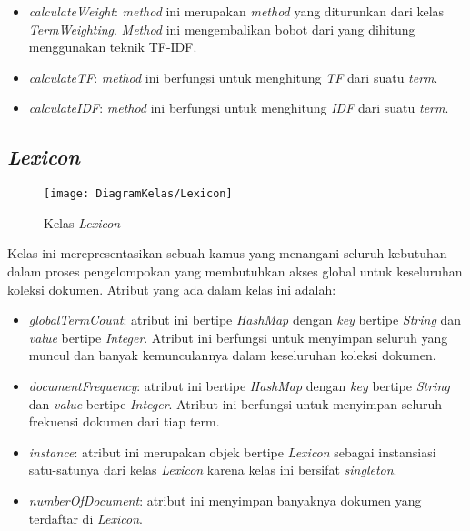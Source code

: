 \begin{itemize}
	\item \textit{calculateWeight}: \textit{method} ini merupakan \textit{method} yang diturunkan dari kelas \textit{TermWeighting}. \textit{Method} ini mengembalikan bobot dari \term yang dihitung menggunakan teknik TF-IDF.
	\item \textit{calculateTF}: \textit{method} ini berfungsi untuk menghitung \textit{TF} dari suatu \textit{term}.
	\item \textit{calculateIDF}: \textit{method} ini berfungsi untuk menghitung \textit{IDF} dari suatu \textit{term}.
\end{itemize}

\subsection{\textit{Lexicon}}

\begin{figure}[H]
	\begin{center}
		\texttt{[image: DiagramKelas/Lexicon]}
		\caption{Kelas \textit{Lexicon}}
		\label{fig:kelasLexicon}
	\end{center}
\end{figure}

Kelas ini merepresentasikan sebuah kamus yang menangani seluruh kebutuhan dalam proses pengelompokan yang membutuhkan akses global untuk keseluruhan koleksi dokumen. Atribut yang ada dalam kelas ini adalah:

\begin{itemize}
	\item \textit{globalTermCount}: atribut ini bertipe \textit{HashMap} dengan \textit{key} bertipe \textit{String} dan \textit{value} bertipe \textit{Integer}. Atribut ini berfungsi untuk menyimpan seluruh \term yang muncul dan banyak kemunculannya dalam keseluruhan koleksi dokumen.
	\item \textit{documentFrequency}: atribut ini bertipe \textit{HashMap} dengan \textit{key} bertipe \textit{String} dan \textit{value} bertipe \textit{Integer}. Atribut ini berfungsi untuk menyimpan seluruh frekuensi dokumen dari tiap term.
	\item \textit{instance}: atribut ini merupakan objek bertipe \textit{Lexicon} sebagai instansiasi satu-satunya dari kelas \textit{Lexicon} karena kelas ini bersifat \textit{singleton}.
	\item \textit{numberOfDocument}: atribut ini menyimpan banyaknya dokumen yang terdaftar di \textit{Lexicon}. 
\end{itemize}


